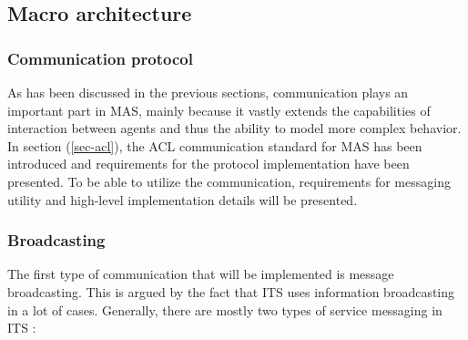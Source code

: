 \documentclass[main.tex]{subfiles}
\begin{document}

\pagebreak



\subsection{Macro architecture}

\subsubsection{Communication protocol}

As has been discussed in the previous sections, communication plays an important part in 
MAS, mainly because it vastly extends the capabilities of interaction between agents and thus 
the ability to model more complex behavior. In section (\ref{sec-acl}), the ACL communication 
standard for MAS has been introduced and requirements for the protocol implementation have 
been presented. To be able to 
utilize the communication, requirements for messaging utility and high-level implementation 
details will be presented. 

\subsubsection{Broadcasting}

The first type of communication that will be implemented is message broadcasting. This is 
argued by the fact that ITS uses information broadcasting in a lot of cases.
Generally, there are mostly two types of service messaging in ITS \cite{Santa2013}:
\end{document}

